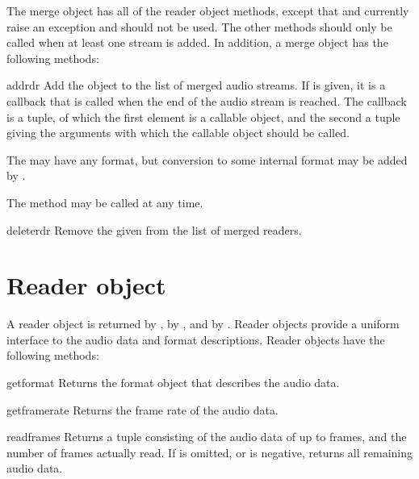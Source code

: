 The merge object has all of the reader object methods, except that
 and  currently raise an exception and
should not be used.  The other methods should only be called when at
least one stream is added.  In addition, a merge object has the
following methods:
\renewcommand{\indexsubitem}{(audiomerge object methods)}

\begin{funcdesc}{add}{rdr}
Add the  object to the list of merged audio streams.  If
 is given, it is a callback that is called when the end
of the audio stream is reached.  The callback is a tuple, of which the
first element is a callable object, and the second a tuple giving the
arguments with which the callable object should be called.

The  may have any format, but conversion to some internal
format may be added by .

The  method may be called at any time.
\end{funcdesc}

\begin{funcdesc}{delete}{rdr}
Remove the given  from the list of merged readers.
\end{funcdesc}

\section{Reader object}
\renewcommand{\indexsubitem}{(reader object methods)}

A reader object is returned by , by
, and by .
Reader objects provide a uniform interface to the audio data and
format descriptions.  Reader objects have the following methods:

\begin{funcdesc}{getformat}{}
Returns the format object that describes the audio data.
\end{funcdesc}

\begin{funcdesc}{getframerate}{}
Returns the frame rate of the audio data.
\end{funcdesc}

\begin{funcdesc}{readframes}{}
Returns a tuple consisting of the audio data of up to 
frames, and the number of frames actually read.  If  is
omitted, or is negative, returns all remaining audio data.
\end{funcdesc}

